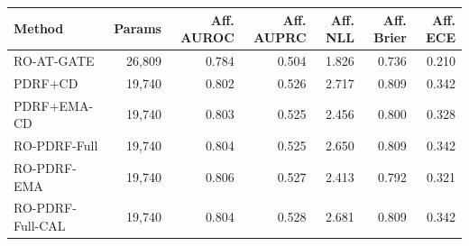 \begin{tabular}{lrrrrrr}
\toprule
Method & Params & Aff. AUROC & Aff. AUPRC & Aff. NLL & Aff. Brier & Aff. ECE \\
\midrule
RO-AT-GATE & 26,809 & 0.784 & 0.504 & 1.826 & 0.736 & 0.210 \\
PDRF+CD & 19,740 & 0.802 & 0.526 & 2.717 & 0.809 & 0.342 \\
PDRF+EMA-CD & 19,740 & 0.803 & 0.525 & 2.456 & 0.800 & 0.328 \\
RO-PDRF-Full & 19,740 & 0.804 & 0.525 & 2.650 & 0.809 & 0.342 \\
RO-PDRF-EMA & 19,740 & 0.806 & 0.527 & 2.413 & 0.792 & 0.321 \\
RO-PDRF-Full-CAL & 19,740 & 0.804 & 0.528 & 2.681 & 0.809 & 0.342 \\
\bottomrule
\end{tabular}
